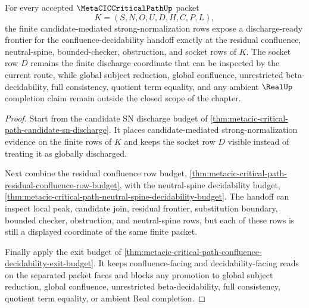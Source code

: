 \begin{theorem}
\label{thm:metacic-critical-path-confluence-decidability-frontier-discharge-readiness}
For every accepted $\MetaCICCriticalPathUp$ packet
$$
K=(S,N,O,U,D,H,C,P,L),
$$
the finite candidate-mediated strong-normalization rows expose a discharge-ready frontier for the confluence-decidability handoff exactly at the residual confluence, neutral-spine, bounded-checker, obstruction, and socket rows of $K$. The socket row $D$ remains the finite discharge coordinate that can be inspected by the current route, while global subject reduction, global confluence, unrestricted beta-decidability, full consistency, quotient term equality, and any ambient $\RealUp$ completion claim remain outside the closed scope of the chapter.
\end{theorem}
\begin{proof}
Start from the candidate SN discharge budget of \autoref{thm:metacic-critical-path-candidate-sn-discharge}. It places candidate-mediated strong-normalization evidence on the finite rows of $K$ and keeps the socket row $D$ visible instead of treating it as globally discharged.

Next combine the residual confluence row budget, \autoref{thm:metacic-critical-path-residual-confluence-row-budget}, with the neutral-spine decidability budget, \autoref{thm:metacic-critical-path-neutral-spine-decidability-budget}. The handoff can inspect local peak, candidate join, residual frontier, substitution boundary, bounded checker, obstruction, and neutral-spine rows, but each of these rows is still a displayed coordinate of the same finite packet.

Finally apply the exit budget of \autoref{thm:metacic-critical-path-confluence-decidability-exit-budget}. It keeps confluence-facing and decidability-facing reads on the separated packet faces and blocks any promotion to global subject reduction, global confluence, unrestricted beta-decidability, full consistency, quotient term equality, or ambient Real completion.
\end{proof}

